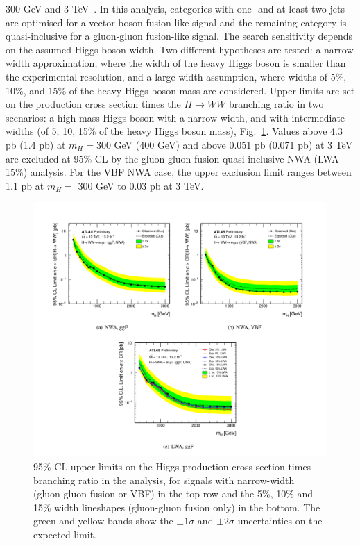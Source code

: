 300 GeV and 3 TeV~\cite{ATLAS-CONF-2016-074}. In this analysis, categories with one- and at least two-jets
are optimised for a vector boson fusion-like signal and the remaining category is quasi-inclusive
for a gluon-gluon fusion-like signal. The search sensitivity depends on the assumed Higgs boson width. Two different hypotheses are tested:
a narrow width approximation, where the width of the heavy Higgs boson is smaller than the
experimental resolution, and a large width assumption, where widths of 5\%, 10\%, and 15\% of
the heavy Higgs boson mass are considered.
Upper limits are set on  the production cross section times the $H \to WW$ branching ratio in two scenarios:
a high-mass Higgs boson with a narrow width, and  with intermediate widths (of 5, 10, 15\% of the
heavy Higgs boson mass), Fig.~\ref{ATLAS-CONF-2016-074_fig}. Values above 4.3 pb (1.4 pb) at $m_H=$300 GeV (400 GeV) and above 0.051 pb
(0.071 pb) at 3 TeV are excluded at 95\% CL by the gluon-gluon fusion quasi-inclusive NWA (LWA 15\%) analysis. For
the VBF NWA case, the upper exclusion limit ranges between 1.1 pb at $m_H=$ 300 GeV to 0.03 pb at 3 TeV.

\begin{figure}
\includegraphics[scale= 0.9]{../Cap1/ATLAS-CONF-2016-074}
\caption{95\% CL upper limits on the Higgs production cross section times branching ratio in the analysis, for signals with narrow-width (gluon-gluon fusion or VBF) in the top row and the 5\%, 10\% and 15\% width lineshapes (gluon-gluon fusion only) in the bottom. The green and yellow bands show the  $\pm 1\sigma$ and  $\pm 2\sigma$ uncertainties on the expected limit. }
\label{ATLAS-CONF-2016-074_fig}
\end{figure}
